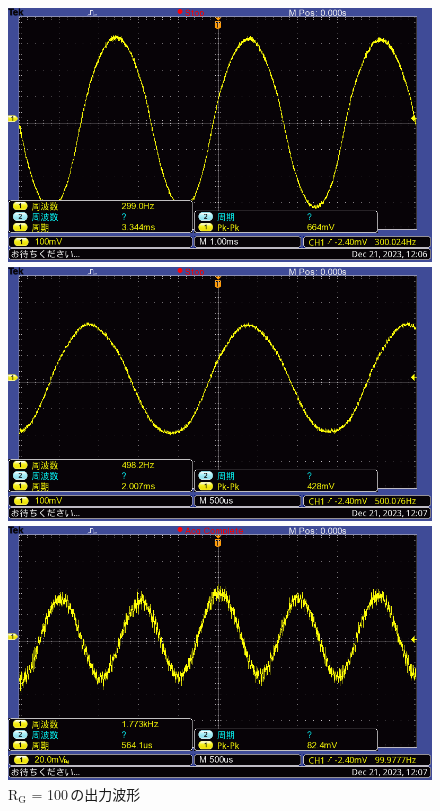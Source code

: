 \documentclass{ltjsarticle}
\begin{document}
\begin{figure}[H]
			\begin{minipage}{0.4\columnwidth}
			\centering
			\includegraphics[width = \columnwidth]{figs/F0008TEK.PNG}
			\end{minipage}
			\hspace{0.04\columnwidth}
			\begin{minipage}{0.4\columnwidth}
			\centering
			\includegraphics[width = \columnwidth]{figs/F0009TEK.PNG}
			\end{minipage}
			\hspace{0.04\columnwidth}
			\begin{minipage}{0.4\columnwidth}
			\centering
			\includegraphics[width = \columnwidth]{figs/F0010TEK.PNG}
			\end{minipage}
			\caption{$\mathrm{R_G}$ = 100\,\Omega の出力波形}
			\label{fig:week5-1-100}
			\end{figure}
\end{document}

